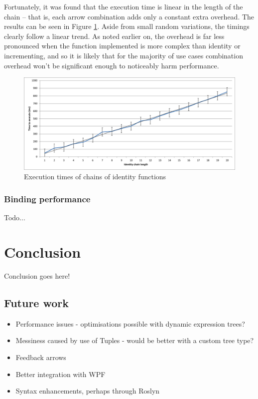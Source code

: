 \documentclass[12pt,twoside,notitlepage]{report}
\begin{document}
Fortunately, it was found that the execution time is linear in the length of the chain -- that is, each arrow combination adds only a constant extra overhead. The results can be seen in Figure \ref{fig:arrow_chaining_overhead}. Aside from small random variations, the timings clearly follow a linear trend. As noted earlier on, the overhead is far less pronounced when the function implemented is more complex than identity or incrementing, and so it is likely that for the majority of use cases combination overhead won't be significant enough to noticeably harm performance.

\begin{figure}[!ht]
  \centering
  \includegraphics[width=\textwidth]{fig/IdentityChains.pdf}
  \caption{Execution times of chains of identity functions}
  \label{fig:arrow_chaining_overhead}
\end{figure}

\subsection{Binding performance}

Todo...

\cleardoublepage



\chapter{Conclusion}

Conclusion goes here!

\section{Future work}

\begin{itemize}
	\item Performance issues - optimisations possible with dynamic expression trees?
	\item Messiness caused by use of Tuples - would be better with a custom tree type?
	\item Feedback arrows
	\item Better integration with WPF
	\item Syntax enhancements, perhaps through Roslyn
\end{itemize}
\end{document}

